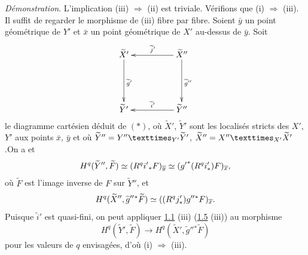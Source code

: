 \documentclass[10pt]{../fichiers-configuration-latex/smfart}
\begin{document}
\noindent
\emph{Démonstration}. L'implication (iii) $\Rightarrow$ (ii) est
triviale. Vérifions que (i) $\Rightarrow$ (iii). Il suffit de regarder
le morphisme de (iii) fibre par fibre. Soient $\bar{y}$ un point
géométrique de $Y'$ et $\bar{x}$ un point géométrique de $X'$
au-dessus de $\bar{y}$. Soit
$$
\xymatrix@=1.75cm{
\widetilde{X}'   \ar[d]^{\widetilde{g}'}& \widetilde{X}''
\ar[l]_{\widetilde{j}'} \ar[d]^{\widetilde{g}''}\\
 \widetilde{Y}'           & \widetilde{Y}'' \ar[l]_{\widetilde{i}'}
}
$$
le diagramme cartésien déduit de $({\ast})$, où $\widetilde{X}'$,
$\widetilde{Y}'$ sont les localisés stricts des $X'$, $Y'$ aux points
$\bar{x}$, $\bar{y}$ et où
$\widetilde{Y}''=\fprod{Y''}{\widetilde{Y}'}{Y'}$,
$\widetilde{X}''=\fprod{X''}{\widetilde{X}'}{X'}$.\pageoriginale On a
 et 
$$
H^{q}(\widetilde{Y}'',\widetilde{F})\simeq
(R^{q}i'{}_{\ast}F)_{\overline{y}}\simeq
({g'}^{\ast}(R^{q}i'_{\ast})F)_{\overline{x}}{},
$$
où $\widetilde{F}$ est l'image inverse de $F$ sur $\widetilde{Y}''$,
et
$$
H^{q}(\widetilde{X}'',{\widetilde{g}''}{}^{\ast}\widetilde{F})\simeq
((R^{q}j'_{\ast}){g''}{}^{\ast}F)_{\overline{x}}{}.
$$
Puisque $\widetilde{i}'$ est quasi-fini, on peut appliquer \hyperref[XV.prop1.1]{1.1} (iii)
(\resp \hyperref[XV.cor1.5]{1.5} (iii)) au morphisme
$$
H^{q}(\widetilde{Y}',\widetilde{F})\longrightarrow
H^{q}(\widetilde{X}',{\widetilde{g}''}{}^{\ast}\widetilde{F})
$$
pour les valeurs de $q$ envisagées, d'où (i) $\Rightarrow$ (iii).
\end{document}
